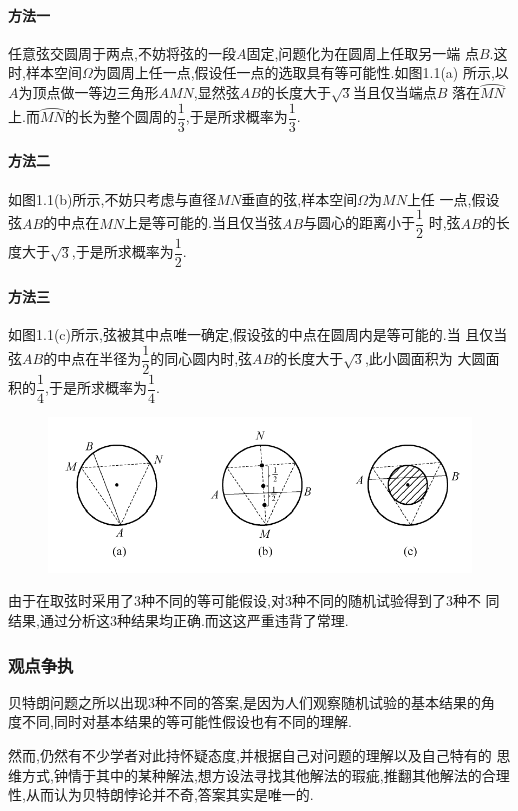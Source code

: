 \paragraph*{方法一} 任意弦交圆周于两点,不妨将弦的一段$A$固定,问题化为在圆周上任取另一端
点$B$.这时,样本空间$\Omega$为圆周上任一点,假设任一点的选取具有等可能性.如图1.1(a)
所示,以$A$为顶点做一等边三角形$AMN$,显然弦$AB$的长度大于$\sqrt{3}$当且仅当端点$B$
落在$\wideparen{MN}$上.而$\wideparen{MN}$的长为整个圆周的$\dfrac{1}{3}$,于是所求概率为$\dfrac{1}{3}$.

\paragraph*{方法二} 如图1.1(b)所示,不妨只考虑与直径$MN$垂直的弦,样本空间$\Omega$为$MN$上任
一点,假设弦$AB$的中点在$MN$上是等可能的.当且仅当弦$AB$与圆心的距离小于$\dfrac{1}{2}$
时,弦$AB$的长度大于$\sqrt{3}$,于是所求概率为$\dfrac{1}{2}$.

\paragraph*{方法三} 如图1.1(c)所示,弦被其中点唯一确定,假设弦的中点在圆周内是等可能的.当
且仅当弦$AB$的中点在半径为$\dfrac{1}{2}$的同心圆内时,弦$AB$的长度大于$\sqrt{3}$,此小圆面积为
大圆面积的$\dfrac{1}{4}$,于是所求概率为$\dfrac{1}{4}$.

\begin{figure}[thbp!]
	\centering
	\includegraphics[width=0.8\linewidth]{figure/circ.png}
	\caption{}
	\label{fig:circ}
\end{figure}

由于在取弦时采用了3种不同的等可能假设,对3种不同的随机试验得到了3种不
同结果,通过分析这3种结果均正确.而这这严重违背了常理.

\subsubsection{观点争执}
贝特朗问题之所以出现3种不同的答案,是因为人们观察随机试验的基本结果的角
度不同,同时对基本结果的等可能性假设也有不同的理解.

\par 然而,仍然有不少学者对此持怀疑态度,并根据自己对问题的理解以及自己特有的
思维方式,钟情于其中的某种解法,想方设法寻找其他解法的瑕疵,推翻其他解法的合理
性,从而认为贝特朗悖论并不奇,答案其实是唯一的.